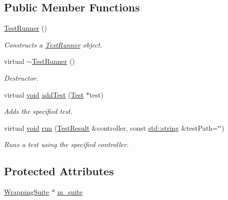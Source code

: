 \subsection*{Public Member Functions}
\begin{DoxyCompactItemize}
\item 
\hyperlink{class_test_runner_adf6d073e739128299841d29a6701d34b}{Test\-Runner} ()
\begin{DoxyCompactList}\small\item\em Constructs a \hyperlink{class_test_runner}{Test\-Runner} object. \end{DoxyCompactList}\item 
virtual \hyperlink{class_test_runner_a29e222f91f622ee3f1c2b7c1317770c7}{$\sim$\-Test\-Runner} ()
\begin{DoxyCompactList}\small\item\em Destructor. \end{DoxyCompactList}\item 
virtual \hyperlink{wglew_8h_aeea6e3dfae3acf232096f57d2d57f084}{void} \hyperlink{class_test_runner_ab9f9503b09b0002615869f39b23680d5}{add\-Test} (\hyperlink{class_test}{Test} $\ast$test)
\begin{DoxyCompactList}\small\item\em Adds the specified test. \end{DoxyCompactList}\item 
virtual \hyperlink{wglew_8h_aeea6e3dfae3acf232096f57d2d57f084}{void} \hyperlink{class_test_runner_aa6a62ec693b671ed1d73b2184d012733}{run} (\hyperlink{class_test_result}{Test\-Result} \&controller, const \hyperlink{glew_8h_ae84541b4f3d8e1ea24ec0f466a8c568b}{std\-::string} \&test\-Path=\char`\"{}\char`\"{})
\begin{DoxyCompactList}\small\item\em Runs a test using the specified controller. \end{DoxyCompactList}\end{DoxyCompactItemize}
\subsection*{Protected Attributes}
\begin{DoxyCompactItemize}
\item 
\hyperlink{class_test_runner_1_1_wrapping_suite}{Wrapping\-Suite} $\ast$ \hyperlink{class_test_runner_afaf76a3691a45fe2c76910d51e949306}{m\-\_\-suite}
\end{DoxyCompactItemize}


